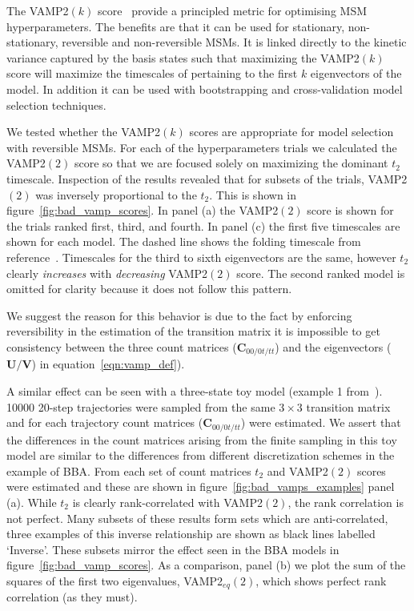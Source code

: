 \documentclass[journal=jacsat,manuscript=article]{achemso}
\begin{document}
The VAMP2$(k)$ score~\cite{wuVariationalApproachLearning2020c} provide a principled metric for optimising MSM hyperparameters. The benefits are that it can be used for stationary, non-stationary, reversible and non-reversible MSMs. It is linked directly to the kinetic variance captured by the basis states such that maximizing the VAMP2$(k)$ score will maximize the timescales of pertaining to the first $k$ eigenvectors of the model. In addition it can be used with bootstrapping and cross-validation model selection techniques. 

We tested whether the VAMP2$(k)$ scores are appropriate for model selection with reversible MSMs. For each of the hyperparameters trials we calculated the VAMP2$(2)$ score so that we are focused solely on maximizing the dominant $t_2$ timescale. Inspection of the results revealed that for subsets of the trials, VAMP2$(2)$ was inversely proportional to the $t_2$. This is shown in figure~\ref{fig:bad_vamp_scores}. In panel (a) the VAMP2$(2)$ score is shown for the trials ranked first, third, and fourth. In panel (c) the first five timescales are shown for each model.  The dashed line shows the folding timescale from reference~\cite{lindorff-larsen_how_2011}. Timescales for the third to sixth eigenvectors are the same, however $t_2$ clearly \emph{increases} with \emph{decreasing} VAMP2$(2)$ score. The second ranked model is omitted for clarity because it does not follow this pattern. 

We suggest the reason for this behavior is due to the fact by enforcing reversibility in the estimation of the transition matrix it is impossible to get consistency between the three count matrices ($\mathbf{C}_{00/0t/tt}$) and the eigenvectors ($\mathbf{U}/\mathbf{V}$) in equation~\ref{eqn:vamp_def}). 

A similar effect can be seen with a three-state toy model (example 1 from~\cite{trendelkamp-schroer_estimation_2015}). \num{10000} 20-step trajectories were sampled from the same $3\times 3$ transition matrix and for each trajectory count matrices ($\mathbf{C}_{00/0t/tt}$) were estimated.  We assert that the differences in the count matrices arising from the finite sampling in this toy model are similar to the differences from different  discretization schemes in the example of BBA.  From each set of count matrices $t_2$ and VAMP2$(2)$ scores were estimated and  these are shown in figure~\ref{fig:bad_vamps_examples} panel (a). While  $t_2$ is clearly rank-correlated with VAMP2$(2)$, the rank correlation is not perfect.  Many subsets of these results  form sets which are anti-correlated,  three examples of this inverse relationship are shown as black lines labelled `Inverse'. These subsets mirror the effect seen in the BBA models in figure~\ref{fig:bad_vamp_scores}.  As a comparison, panel (b) we plot the sum of the squares of the first two eigenvalues, VAMP2$_{eq}(2)$, which shows perfect rank correlation (as they must). 
\end{document}
